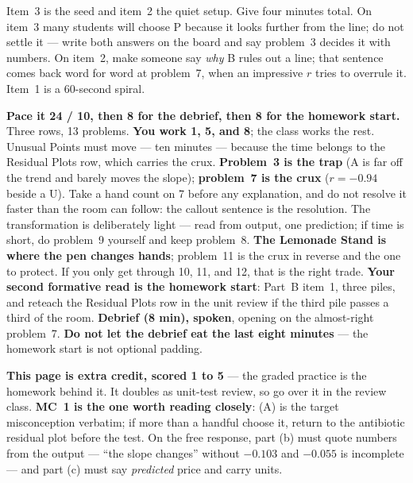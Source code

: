 \documentclass[10pt]{article}
\begin{document}
\begin{teachernote}[Warm-Up]
Item~3 is the seed and item~2 the quiet setup. Give four minutes total. On item~3 many students
will choose P because it looks further from the line; do not settle it --- write both answers on
the board and say problem~3 decides it with numbers. On item~2, make someone say \emph{why} B
rules out a line; that sentence comes back word for word at problem~7, when an impressive $r$
tries to overrule it. Item~1 is a 60-second spiral.
\end{teachernote}

\begin{teachernote}
\textbf{Pace it 24 / 10, then 8 for the debrief, then 8 for the homework start.} Three rows, 13
problems. \textbf{You work 1, 5, and 8}; the class works the rest. Unusual Points must move ---
ten minutes --- because the time belongs to the Residual Plots row, which carries the crux.
\textbf{Problem~3 is the trap} (A is far off the trend and barely moves the slope);
\textbf{problem~7 is the crux} ($r = -0.94$ beside a U). Take a hand count on 7 before any
explanation, and do not resolve it faster than the room can follow: the callout sentence is the
resolution. The transformation is deliberately light --- read from output, one prediction; if
time is short, do problem~9 yourself and keep problem~8. \textbf{The Lemonade Stand is where
the pen changes hands}; problem~11 is the crux in reverse and the one to protect. If you only
get through 10, 11, and 12, that is the right trade. \textbf{Your second formative read is
the homework start}: Part~B item~1, three piles, and reteach the Residual Plots row in the
unit review if the third pile passes a third of the room.
\textbf{Debrief (8 min), spoken}, opening on the almost-right problem~7. \textbf{Do not let the
debrief eat the last eight minutes} --- the homework start is not optional padding.
\end{teachernote}

\begin{teachernote}[AP Practice]
\textbf{This page is extra credit, scored 1 to 5} --- the graded practice is the homework
behind it. It doubles as unit-test review, so go over it in the review class. \textbf{MC~1 is
the one worth reading closely}: (A) is the target misconception verbatim; if more than a handful
choose it, return to the antibiotic residual plot before the test. On the free response, part
(b) must quote numbers from the output --- ``the slope changes'' without $-0.103$ and $-0.055$
is incomplete --- and part (c) must say \emph{predicted} price and carry units.
\end{teachernote}
\end{document}
